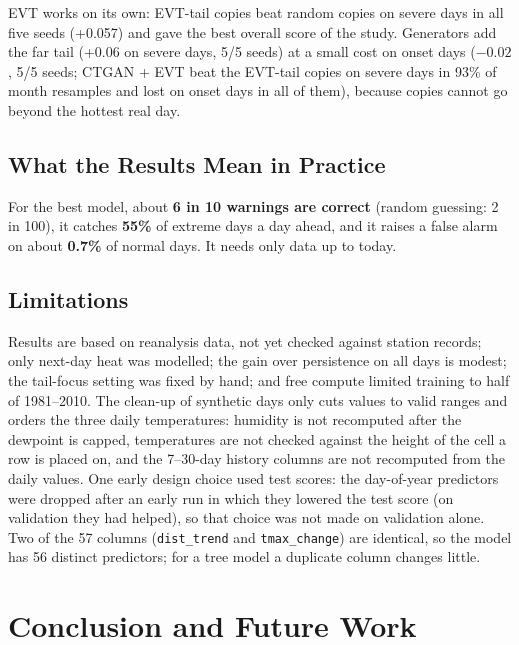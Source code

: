 \documentclass[12pt,a4paper]{report}
\begin{document}
EVT works on its own: EVT-tail copies beat random copies on severe days in all five seeds (+0.057) and gave the best
overall score of the study. Generators add the far tail (+0.06 on severe days, 5/5 seeds) at a small cost on onset
days ($-0.02$, 5/5 seeds; CTGAN + EVT beat the EVT-tail copies on severe days in 93\% of month resamples and lost
on onset days in all of them), because copies cannot go beyond the hottest real day.

\section{What the Results Mean in Practice}
For the best model, about \textbf{6 in 10 warnings are correct} (random guessing: 2 in 100), it catches \textbf{55\%}
of extreme days a day ahead, and it raises a false alarm on about \textbf{0.7\%} of normal days. It needs only data up
to today.

\section{Limitations}
\label{sec:limits}
Results are based on reanalysis data, not yet checked against station records; only next-day heat was modelled; the
gain over persistence on all days is modest; the tail-focus setting was fixed by hand; and free compute limited
training to half of 1981--2010. The clean-up of synthetic days only cuts values to valid ranges and orders the three
daily temperatures: humidity is not recomputed after the dewpoint is capped, temperatures are not checked against
the height of the cell a row is placed on, and the 7--30-day history columns are not recomputed from the daily
values. One early design choice used test scores: the day-of-year predictors were dropped after an early run in which
they lowered the test score (on validation they had helped), so that choice was not made on validation alone. Two of
the 57 columns (\texttt{dist\_trend} and \texttt{tmax\_change}) are identical, so the model has 56 distinct
predictors; for a tree model a duplicate column changes little.

\chapter{Conclusion and Future Work}
\end{document}
